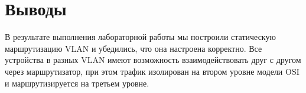 \section{Выводы}

В результате выполнения лабораторной работы мы построили статическую маршрутизацию VLAN и убедились, что она настроена корректно. Все устройства в разных VLAN имеют возможность взаимодействовать друг с другом через маршрутизатор, при этом трафик изолирован на втором уровне модели OSI и маршрутизируется на третьем уровне.


